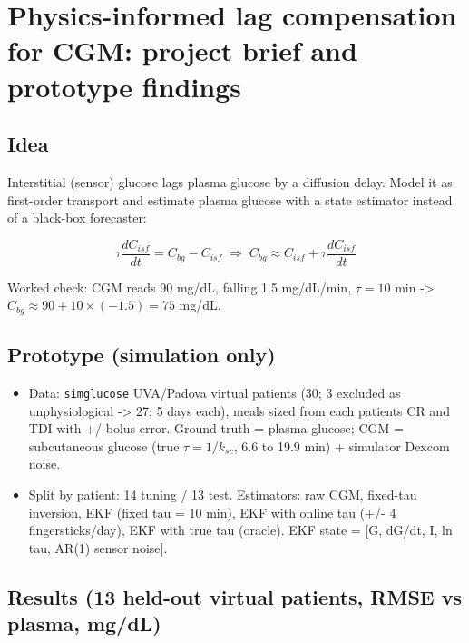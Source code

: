 \documentclass[11pt,a4paper]{article}
\providecommand{\tightlist}{\setlength{\itemsep}{0pt}\setlength{\parskip}{0pt}}
\begin{document}
\hypertarget{physics-informed-lag-compensation-for-cgm-project-brief-and-prototype-findings}{%
\section{Physics-informed lag compensation for CGM: project brief and
prototype
findings}\label{physics-informed-lag-compensation-for-cgm-project-brief-and-prototype-findings}}

\hypertarget{idea}{%
\subsection{Idea}\label{idea}}

Interstitial (sensor) glucose lags plasma glucose by a diffusion delay.
Model it as first-order transport and estimate plasma glucose with a
state estimator instead of a black-box forecaster:

\[\tau \frac{dC_{isf}}{dt} = C_{bg} - C_{isf} \;\Rightarrow\; C_{bg} \approx C_{isf} + \tau \frac{dC_{isf}}{dt}\]

Worked check: CGM reads 90 mg/dL, falling 1.5 mg/dL/min, \(\tau = 10\)
min -\textgreater{} \(C_{bg} \approx 90 + 10 \times (-1.5) = 75\) mg/dL.

\hypertarget{prototype-simulation-only}{%
\subsection{Prototype (simulation
only)}\label{prototype-simulation-only}}

\begin{itemize}
\tightlist
\item
  Data: \texttt{simglucose} UVA/Padova virtual patients (30; 3 excluded
  as unphysiological -\textgreater{} 27; 5 days each), meals sized from
  each patient\textquotesingle s CR and TDI with +/-bolus error. Ground
  truth = plasma glucose; CGM = subcutaneous glucose (true
  \(\tau = 1/k_{sc}\), 6.6 to 19.9 min) + simulator Dexcom noise.
\item
  Split by patient: 14 tuning / 13 test. Estimators: raw CGM, fixed-tau
  inversion, EKF (fixed tau = 10 min), EKF with online tau (+/- 4
  fingersticks/day), EKF with true tau (oracle). EKF state = {[}G,
  dG/dt, I, ln tau, AR(1) sensor noise{]}.
\end{itemize}

\hypertarget{results-13-held-out-virtual-patients-rmse-vs-plasma-mgdl}{%
\subsection{Results (13 held-out virtual patients, RMSE vs plasma,
mg/dL)}\label{results-13-held-out-virtual-patients-rmse-vs-plasma-mgdl}}
\end{document}
